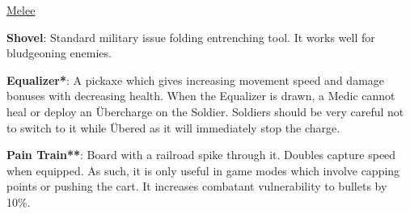 \newpage

\begin {center}
\underline {Melee}
\end {center}

{\bf Shovel}: Standard military issue folding entrenching tool. It works well for bludgeoning enemies. 

{\bf Equalizer*}: A pickaxe which gives increasing movement speed and damage bonuses with decreasing health. When the Equalizer is drawn, a Medic cannot heal or deploy an Übercharge on the Soldier.  Soldiers should be very careful not to switch to it while Übered as it will immediately stop the charge.

{\bf Pain Train**}: Board with a railroad spike through it. Doubles capture speed when equipped. As such, it is only useful in game modes which involve capping points or pushing the cart. It increases combatant vulnerability to bullets by 10\%.

